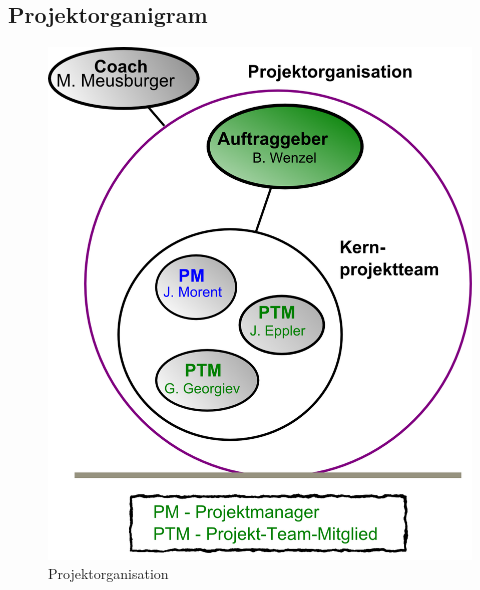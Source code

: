 \subsection{Projektorganigram}
\begin{figure}[!ht]
\center
\includegraphics[width=.7\textwidth, height=.7\textheight, keepaspectratio, angle=0]{images/projektorganisation}
\caption{Projektorganisation}
\end{figure}